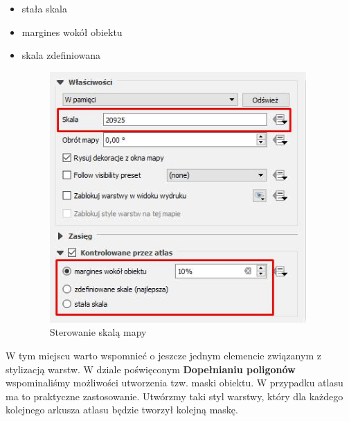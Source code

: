\documentclass[12pt,a4paper]{book}
\begin{document}
\begin{itemize}
\item stała skala
\item margines wokół obiektu
\item skala zdefiniowana
\begin{center}
\begin{figure}
\includegraphics[width=9.797cm,height=9.581cm]{008-atlas-skala.png}
\caption{Sterowanie skalą mapy}
\end{figure}
\end{center}
\end{itemize}
W tym miejscu warto wspomnieć o jeszcze jednym elemencie związanym z stylizacją warstw. W dziale poświęconym \textbf{Dopełnianiu poligonów }wspominaliśmy\textbf{ }możliwości utworzenia tzw. maski obiektu. W przypadku atlasu ma to praktyczne zastosowanie. Utwórzmy taki styl warstwy, który dla każdego kolejnego arkusza atlasu będzie tworzył kolejną maskę.
\end{document}
